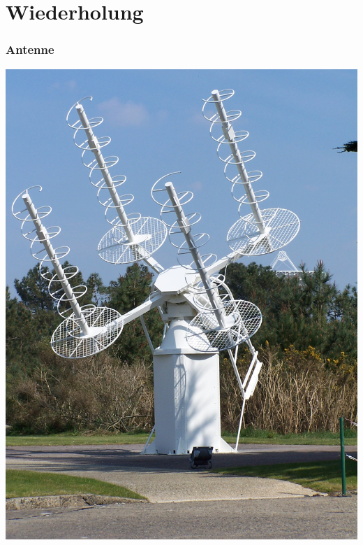 

\subtitle{Technik A09: \\
           Antennentechnik  \\[2em]}
\date{Stand 01.06.2015}


\section*{Wiederholung}

\begin{frame}
    \frametitle{Antenne}
      \begin{center}
        \includegraphics[width=.6\textwidth]{e11/Traqueur_acquisition.JPG}
        \tiny \hyperlink{refs}{\cite{wm}}
    \end{center}
\end{frame}

